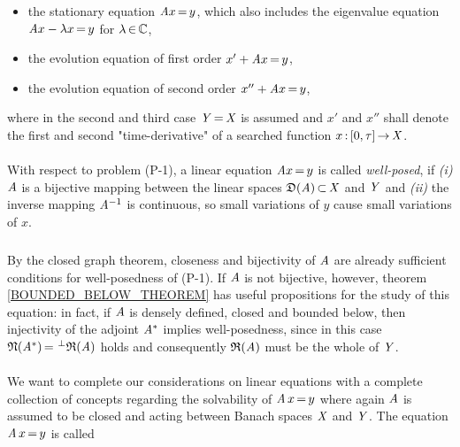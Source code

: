 \documentclass[11pt,twoside]{article}
\begin{document}
\begin{itemize}[leftmargin=12mm]
\item[(P-1)]
the stationary equation $\mathit{A} x {\,=\,} y$,
which also includes the eigen\-value equation $\mathit{A} x - \lambda x {\,=\,} y$
for $\lambda {\,\in\,} {\mathbb{C}}$,
\item[(P-2)]
the evolution equation of first order $x' + \mathit{A} x {\,=\,} y$,
\item[(P-3)]
the evolution equation of second order $x'' + \mathit{A} x {\,=\,} y$,
\end{itemize}

where in the second and third case $\mathit{Y} {\,=\,} \mathit{X}$ is assumed
and $x'$ and $x''$ shall denote the first and second "time-derivative"
of a searched function $x{\,:\,}[0,\tau] {\,\to\,} \mathit{X}$.

\paragraph{} %
With respect to problem (P-1),
a linear equation $\mathit{A} x {\,=\,} y$ is called \textit{well-posed},
if
\textit{(i)}  $\mathit{A}$ is a bijective mapping
              between the linear spaces $\mathfrak{D}(\mathit{A})
              {\,\subset\,} \mathit{X}$ and $\mathit{Y}$ and
\textit{(ii)} the inverse mapping $\mathit{A}^{-1}$ is continuous,
              so small variations of $y$ cause small variations of $x$.

\subparagraph{}
By the closed graph theorem,
closeness and bijectivity of $\mathit{A}$ are already sufficient conditions
for well-posedness of (P-1).
If $\mathit{A}$ is not bijective,
however,
theorem \ref{BOUNDED_BELOW_THEOREM} has useful propositions
for the study of this equation:
in fact,
if $\mathit{A}$ is densely defined, closed and bounded below,
then injectivity of the adjoint $\mathit{A}^*$ implies well-posedness,
since in this case $\mathfrak{N}(\mathit{A}^*) {\,=\,} \, ^{\bot}\mathfrak{R}(\mathit{A})$ holds
and consequently $\mathfrak{R}(\mathit{A})$ must be the whole of $\mathit{Y}$.

\paragraph{} %
We want to complete our considerations on linear equations
with a complete collection of concepts
regarding the solvability of $\mathit{A} \, x {\,=\,} y$
where again $\mathit{A}$ is assumed to be closed and
acting between Banach spaces $\mathit{X}$ and $\mathit{Y}$.
The equation $\mathit{A} \, x {\,=\,} y$ is called
\end{document}
